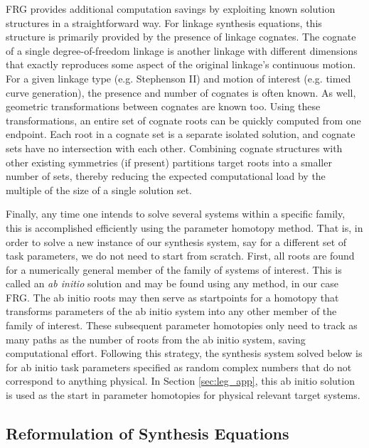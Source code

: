 \documentclass[journal]{IEEEtran}
\begin{document}
FRG provides additional computation savings by exploiting known solution structures in a straightforward way.
For linkage synthesis equations, this structure is primarily provided by the presence of linkage cognates.
The cognate of a single degree-of-freedom linkage is another linkage with different dimensions that exactly reproduces some aspect of the original linkage's continuous motion.
For a given linkage type (e.g. Stephenson II) and motion of interest (e.g. timed curve generation), the presence and number of cognates is often known.
As well, geometric transformations between cognates are known too.
Using these transformations, an entire set of cognate roots can be quickly computed from one endpoint.
Each root in a cognate set is a separate isolated solution, and cognate sets have no intersection with each other.
Combining cognate structures with other existing symmetries (if present) partitions target roots into a smaller number of sets, thereby reducing the expected computational load by the multiple of the size of a single solution set.


Finally, any time one intends to solve several systems within a specific family, this is accomplished efficiently using the parameter homotopy method.
That is, in order to solve a new instance of our synthesis system, say for a different set of task parameters, we do not need to start from scratch.
First, all roots are found for a numerically general member of the family of systems of interest.
This is called an \emph{ab initio} solution and may be found using any method, in our case FRG.
The ab initio roots may then serve as startpoints for a homotopy that transforms parameters of the ab initio system into any other member of the family of interest.
These subsequent parameter homotopies only need to track as many paths as the number of roots from the ab initio system, saving computational effort.
Following this strategy, the synthesis system solved below is for ab initio task parameters specified as random complex numbers that do not correspond to anything physical.
In Section \ref{sec:leg_app}, this ab initio solution is used as the start in parameter homotopies for physical relevant target systems.









\subsection{Reformulation of Synthesis Equations}
\label{sec:reform_synth_eq}
\end{document}
